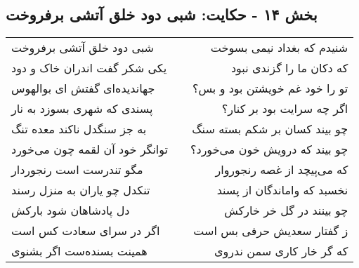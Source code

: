 \begin{center}
\section*{بخش ۱۴ - حکایت: شبی دود خلق آتشی برفروخت}
\label{sec:014}
\begin{longtable}{l p{0.5cm} r}
شبی دود خلق آتشی برفروخت
&&
شنیدم که بغداد نیمی بسوخت
\\
یکی شکر گفت اندران خاک و دود
&&
که دکان ما را گزندی نبود
\\
جهاندیده‌ای گفتش ای بوالهوس
&&
تو را خود غم خویشتن بود و بس؟
\\
پسندی که شهری بسوزد به نار
&&
اگر چه سرایت بود بر کنار؟
\\
به جز سنگدل ناکند معده تنگ
&&
چو بیند کسان بر شکم بسته سنگ
\\
توانگر خود آن لقمه چون می‌خورد
&&
چو بیند که درویش خون می‌خورد؟
\\
مگو تندرست است رنجوردار
&&
که می‌پیچد از غصه رنجوروار
\\
تنکدل چو یاران به منزل رسند
&&
نخسبد که واماندگان از پسند
\\
دل پادشاهان شود بارکش
&&
چو بینند در گل خر خارکش
\\
اگر در سرای سعادت کس است
&&
ز گفتار سعدیش حرفی بس است
\\
همینت بسنده‌ست اگر بشنوی
&&
که گر خار کاری سمن ندروی
\\
\end{longtable}
\end{center}
